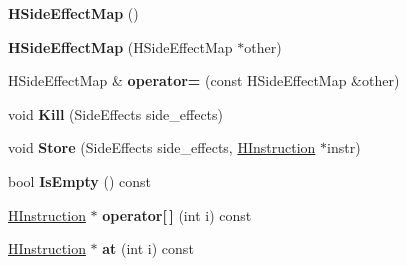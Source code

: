 \begin{DoxyCompactItemize}
\item 
\hypertarget{classv8_1_1internal_1_1_b_a_s_e___e_m_b_e_d_d_e_d_ad03b7d21080e79d30b306aa2f08e7726}{}{\bfseries H\+Side\+Effect\+Map} ()\label{classv8_1_1internal_1_1_b_a_s_e___e_m_b_e_d_d_e_d_ad03b7d21080e79d30b306aa2f08e7726}

\item 
\hypertarget{classv8_1_1internal_1_1_b_a_s_e___e_m_b_e_d_d_e_d_ae8b7c9e37779ef046adef2d0b1124ca8}{}{\bfseries H\+Side\+Effect\+Map} (H\+Side\+Effect\+Map $\ast$other)\label{classv8_1_1internal_1_1_b_a_s_e___e_m_b_e_d_d_e_d_ae8b7c9e37779ef046adef2d0b1124ca8}

\item 
\hypertarget{classv8_1_1internal_1_1_b_a_s_e___e_m_b_e_d_d_e_d_a8600599a076a13fd18bd855ee2720283}{}H\+Side\+Effect\+Map \& {\bfseries operator=} (const H\+Side\+Effect\+Map \&other)\label{classv8_1_1internal_1_1_b_a_s_e___e_m_b_e_d_d_e_d_a8600599a076a13fd18bd855ee2720283}

\item 
\hypertarget{classv8_1_1internal_1_1_b_a_s_e___e_m_b_e_d_d_e_d_acfebfb0a7452a2905af5069ea209c153}{}void {\bfseries Kill} (Side\+Effects side\+\_\+effects)\label{classv8_1_1internal_1_1_b_a_s_e___e_m_b_e_d_d_e_d_acfebfb0a7452a2905af5069ea209c153}

\item 
\hypertarget{classv8_1_1internal_1_1_b_a_s_e___e_m_b_e_d_d_e_d_ab1652a0302b9ad6a62dc984cf05f22aa}{}void {\bfseries Store} (Side\+Effects side\+\_\+effects, \hyperlink{classv8_1_1internal_1_1_h_instruction}{H\+Instruction} $\ast$instr)\label{classv8_1_1internal_1_1_b_a_s_e___e_m_b_e_d_d_e_d_ab1652a0302b9ad6a62dc984cf05f22aa}

\item 
\hypertarget{classv8_1_1internal_1_1_b_a_s_e___e_m_b_e_d_d_e_d_a73fac08bafbeb8e39059e17d4e7db0b7}{}bool {\bfseries Is\+Empty} () const \label{classv8_1_1internal_1_1_b_a_s_e___e_m_b_e_d_d_e_d_a73fac08bafbeb8e39059e17d4e7db0b7}

\item 
\hypertarget{classv8_1_1internal_1_1_b_a_s_e___e_m_b_e_d_d_e_d_a594fb759cccf97d9df4f472ef9f06185}{}\hyperlink{classv8_1_1internal_1_1_h_instruction}{H\+Instruction} $\ast$ {\bfseries operator\mbox{[}$\,$\mbox{]}} (int i) const \label{classv8_1_1internal_1_1_b_a_s_e___e_m_b_e_d_d_e_d_a594fb759cccf97d9df4f472ef9f06185}

\item 
\hypertarget{classv8_1_1internal_1_1_b_a_s_e___e_m_b_e_d_d_e_d_ab748f172bf9bb220fe73db25f3111525}{}\hyperlink{classv8_1_1internal_1_1_h_instruction}{H\+Instruction} $\ast$ {\bfseries at} (int i) const \label{classv8_1_1internal_1_1_b_a_s_e___e_m_b_e_d_d_e_d_ab748f172bf9bb220fe73db25f3111525}


\end{DoxyCompactItemize}
